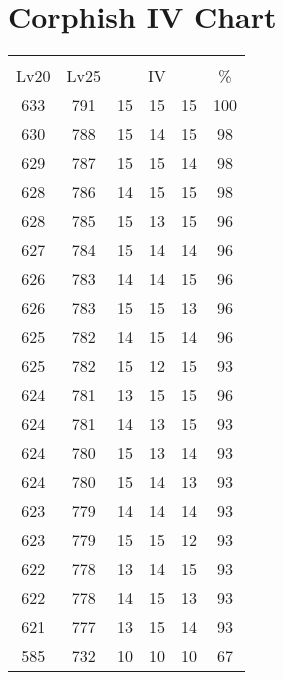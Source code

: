 \documentclass{article}%
\begin{document}
%
\normalsize%
\section{Corphish IV Chart}%
\label{sec:Corphish IV Chart}%
\renewcommand{\arraystretch}{1.5}%
\begin{tabular}{|c|c|c|c|c|c|}%
\hline%
\multicolumn{6}{|c|}{\textcolor{white}{ 
\linebreak{Corphish}
}%
\cellcolor{black}}\\%
\multicolumn{1}{|c}{Lv20}&\multicolumn{1}{c|}{Lv25}&\multicolumn{3}{c|}{IV}&\multicolumn{1}{|c|}{\%}\\%
\hline%
\rowcolor{color100}%
633&791&15&15&15&100\\%
\hline%
\rowcolor{color98}%
630&788&15&14&15&98\\%
\hline%
\rowcolor{color98}%
629&787&15&15&14&98\\%
\hline%
\rowcolor{color98}%
628&786&14&15&15&98\\%
\hline%
\rowcolor{color96}%
628&785&15&13&15&96\\%
\hline%
\rowcolor{color96}%
627&784&15&14&14&96\\%
\hline%
\rowcolor{color96}%
626&783&14&14&15&96\\%
\hline%
\rowcolor{color96}%
626&783&15&15&13&96\\%
\hline%
\rowcolor{color96}%
625&782&14&15&14&96\\%
\hline%
\rowcolor{color93}%
625&782&15&12&15&93\\%
\hline%
\rowcolor{color96}%
624&781&13&15&15&96\\%
\hline%
\rowcolor{color93}%
624&781&14&13&15&93\\%
\hline%
\rowcolor{color93}%
624&780&15&13&14&93\\%
\hline%
\rowcolor{color93}%
624&780&15&14&13&93\\%
\hline%
\rowcolor{color93}%
623&779&14&14&14&93\\%
\hline%
\rowcolor{color93}%
623&779&15&15&12&93\\%
\hline%
\rowcolor{color93}%
622&778&13&14&15&93\\%
\hline%
\rowcolor{color93}%
622&778&14&15&13&93\\%
\hline%
\rowcolor{color93}%
621&777&13&15&14&93\\%
\hline%
\rowcolor{color91}%
585&732&10&10&10&67\\%
\end{tabular}

%
\end{document}
